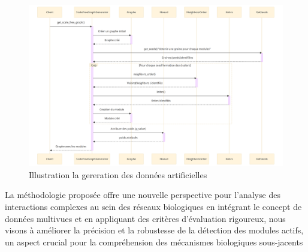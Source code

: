 \begin{figure}[h]
\centering
\includegraphics[width=1\textwidth]{Pictures/sequence_diagramme.png}
\captionsetup{justification=centering}
\caption{Illustration la gereration des  données artificielles }
\label{fig:sequence_Diagramme}
\end{figure}

La méthodologie proposée offre une nouvelle perspective pour l'analyse des interactions complexes au sein des réseaux biologiques en intégrant le concept de données multivues et en appliquant des critères d'évaluation rigoureux, nous visons à améliorer la précision et la robustesse de la détection des modules actifs, un aspect crucial pour la compréhension des mécanismes biologiques sous-jacents

